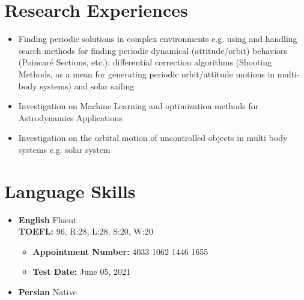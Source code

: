 \documentclass[10pt,a4paper,times]{moderncv}
\begin{document}
\section{Research Experiences}
\begin{itemize}
\item Finding periodic solutions in complex environments e.g. using and handling search methods for finding periodic dynamical (attitude/orbit) behaviors (Poincar\'e Sections, etc.); differential correction algorithms (Shooting Methods, as a mean for generating periodic orbit/attitude motions in multi-body systems) and solar sailing
\item{Investigation on Machine Learning and optimization methods for Astrodynamics Applications}
\item Investigation on the orbital motion of uncontrolled objects in multi body systems e.g. solar system
\end{itemize}


\section{Language Skills}
\begin{itemize}
	\item \textbf{English} \hspace{6 pt} Fluent
	\\\textbf{ \hspace{3 pt} TOEFL:}  96, R:28, L:28, S:20, W:20
	\begin{itemize}
	\item \textbf{ \hspace{6 pt} Appointment Number:}  4033 1062 1446 1655
	\item \textbf{ \hspace{6 pt} Test Date: }  June 05, 2021
	\end{itemize} 
	\item \textbf{Persian} \hspace{5 pt} Native
\end{itemize} 
\end{document}
